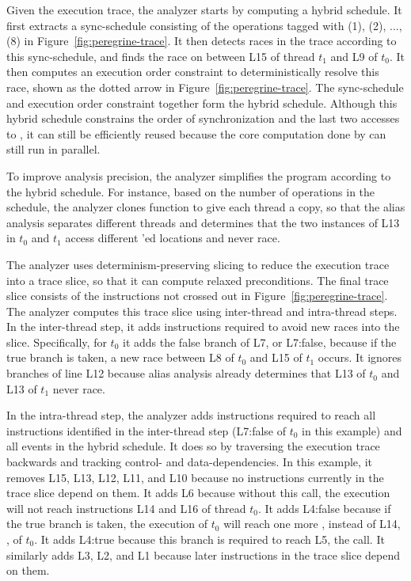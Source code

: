 Given the execution trace, the analyzer starts by computing a hybrid
schedule.  It first extracts a sync-schedule consisting of the operations
tagged with (1), (2), ..., (8) in Figure~\ref{fig:peregrine-trace}.  It then detects races in
the trace according to this sync-schedule, and finds the race on
 between L15 of thread $t_1$ and L9 of $t_0$.  It then computes an
execution order constraint to deterministically resolve this race, shown
as the dotted arrow in Figure~\ref{fig:peregrine-trace}.  The sync-schedule and
execution order constraint together form the hybrid schedule.  Although
this hybrid schedule constrains the order of synchronization and the last
two accesses to , it can still be efficiently reused because the
core computation done by  can still run in parallel.


To improve analysis precision, the analyzer simplifies the program according to the
hybrid schedule.  For instance, based on the number of
 operations in the schedule, the analyzer
clones function  to give each thread a copy,
so that the alias analysis separates different threads and determines that
the two instances of L13 in $t_0$ and $t_1$ access different
'ed locations and never race.

The analyzer uses
determinism-preserving slicing to reduce the execution trace into a trace
slice, so that it can compute relaxed preconditions.
The final trace slice consists of the instructions not crossed out
in Figure~\ref{fig:peregrine-trace}.
The analyzer computes this trace slice using inter-thread and 
intra-thread steps.  In the inter-thread step, it adds instructions
required to avoid new races into the slice.  Specifically, for $t_0$ it adds
the false branch of L7, or L7:false, because if the true branch
is taken, a new race between L8 of $t_0$ and L15 of $t_1$ occurs.  It
ignores branches of line L12 because alias analysis already determines that L13 of
$t_0$ and L13 of $t_1$ never race.

In the intra-thread step, the analyzer adds instructions required 
to reach all instructions identified in the
inter-thread step (L7:false of $t_0$ in this example) and all events in
the hybrid schedule.  It does so by traversing the execution trace
backwards and tracking control- and data-dependencies.  In this example, it
removes L15, L13, L12, L11, and L10 because no instructions currently in
the trace slice depend on them.  It adds L6 because without this call, the
execution will not reach instructions L14 and L16 of thread $t_0$.  It adds
L4:false because if the true branch is taken, the execution of $t_0$ will
reach one more , instead of L14,
, of $t_0$.  It adds L4:true because this branch
is required to reach L5, the  call.  It similarly
adds L3, L2, and L1 because later instructions in the trace slice
depend on them.


